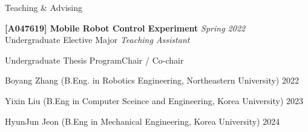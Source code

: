 \begin{rSection}{Teaching \& Advising}

{\bf[A047619] Mobile Robot Control Experiment } \hfill {\em Spring 2022} \\
Undergraduate Elective Major \hfill {\em Teaching Assistant}\\




\begin{rSubsection}{Undergraduate Thesis Program}{}{Chair / Co-chair }{}
  \item Boyang Zhang (B.Eng. in {Robotics Engineering}, Northeastern University) \hfill 2022
  \item Yixin Liu (B.Eng in {Computer Sceince and Engineering}, Korea University) \hfill 2023
  \item HyunJun Jeon (B.Eng in {Mechanical Engineering}, Korea University) \hfill 2024
\end{rSubsection}

\end{rSection}
